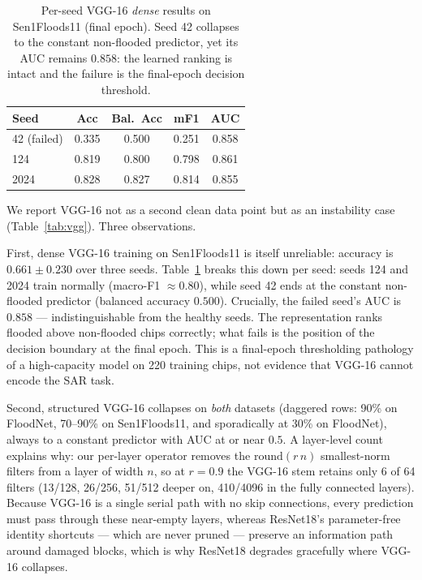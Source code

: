 \documentclass[conference]{IEEEtran}
\begin{document}
\begin{table}[t]
\centering
\caption{Per-seed VGG-16 \emph{dense} results on Sen1Floods11
(final epoch). Seed 42 collapses to the constant non-flooded
predictor, yet its AUC remains $0.858$: the learned ranking is intact
and the failure is the final-epoch decision threshold.}
\label{tab:vggperseed}
\footnotesize
\begin{tabular}{lcccc}
\toprule
\textbf{Seed} & \textbf{Acc} & \textbf{Bal.\ Acc} & \textbf{mF1} &
\textbf{AUC}\\
\midrule
42 (failed) & 0.335 & 0.500 & 0.251 & 0.858\\
124         & 0.819 & 0.800 & 0.798 & 0.861\\
2024        & 0.828 & 0.827 & 0.814 & 0.855\\
\bottomrule
\end{tabular}
\end{table}

We report VGG-16 not as a second clean data point but as an
instability case (Table~\ref{tab:vgg}). Three observations.

First, dense VGG-16 training on Sen1Floods11 is itself unreliable:
accuracy is $0.661\pm0.230$ over three seeds.
Table~\ref{tab:vggperseed} breaks this down per seed: seeds 124 and
2024 train normally (macro-F1 $\approx 0.80$), while seed 42 ends at
the constant non-flooded predictor (balanced accuracy $0.500$).
Crucially, the failed seed's AUC is $0.858$ --- indistinguishable from
the healthy seeds. The representation ranks flooded above non-flooded
chips correctly; what fails is the position of the decision boundary
at the final epoch. This is a final-epoch thresholding pathology of a
high-capacity model on 220 training chips, not evidence that VGG-16
cannot encode the SAR task.

Second, structured VGG-16 collapses on \emph{both} datasets (daggered
rows: 90\% on FloodNet, 70--90\% on Sen1Floods11, and sporadically at
30\% on FloodNet), always to a constant predictor with AUC at or near
$0.5$. A layer-level count explains why: our per-layer operator removes
the $\mathrm{round}(r\,n)$ smallest-norm filters from a layer of width
$n$, so at $r=0.9$ the VGG-16 stem retains only 6 of 64 filters
(13/128, 26/256, 51/512 deeper on, 410/4096 in the fully connected
layers). Because VGG-16 is a single serial path with no skip
connections, every prediction must pass through these near-empty
layers, whereas ResNet18's parameter-free identity shortcuts --- which
are never pruned --- preserve an information path around damaged
blocks, which is why ResNet18 degrades gracefully where VGG-16
collapses.
\end{document}
